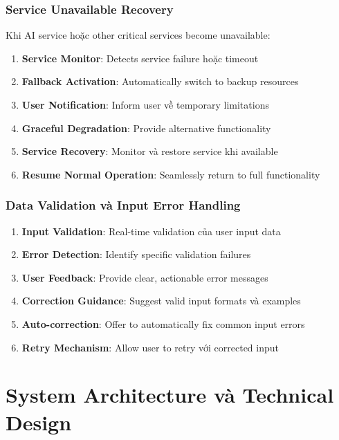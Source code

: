 \subsubsection{Service Unavailable Recovery}

Khi AI service hoặc other critical services become unavailable:

\begin{enumerate}
    \item \textbf{Service Monitor}: Detects service failure hoặc timeout
    \item \textbf{Fallback Activation}: Automatically switch to backup resources
    \item \textbf{User Notification}: Inform user về temporary limitations
    \item \textbf{Graceful Degradation}: Provide alternative functionality
    \item \textbf{Service Recovery}: Monitor và restore service khi available
    \item \textbf{Resume Normal Operation}: Seamlessly return to full functionality
\end{enumerate}

\subsubsection{Data Validation và Input Error Handling}

\begin{enumerate}
    \item \textbf{Input Validation}: Real-time validation của user input data
    \item \textbf{Error Detection}: Identify specific validation failures
    \item \textbf{User Feedback}: Provide clear, actionable error messages
    \item \textbf{Correction Guidance}: Suggest valid input formats và examples
    \item \textbf{Auto-correction}: Offer to automatically fix common input errors
    \item \textbf{Retry Mechanism}: Allow user to retry với corrected input
\end{enumerate}

\section{System Architecture và Technical Design}
\label{sec:system-architecture}

